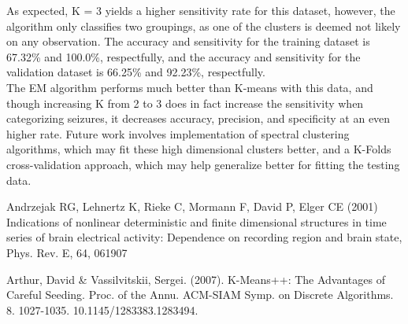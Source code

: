 \documentclass[tikz]{article}
\begin{document}
As expected, K = 3 yields a higher sensitivity rate for this dataset, however, the algorithm only classifies two groupings, as one of the clusters is deemed not likely on any observation. The accuracy and sensitivity for the training dataset is 67.32\% and 100.0\%, respectfully, and the accuracy and sensitivity for the validation dataset is 66.25\% and 92.23\%, respectfully. \\

The EM algorithm performs much better than K-means with this data, and though increasing K from 2 to 3 does in fact increase the sensitivity when categorizing seizures, it decreases accuracy, precision, and specificity at an even higher rate. Future work involves implementation of spectral clustering algorithms, which may fit these high dimensional clusters better, and a K-Folds cross-validation approach, which may help generalize better for fitting the testing data.

\begin{thebibliography}{666}
Andrzejak RG, Lehnertz K, Rieke C, Mormann F, David P, Elger CE (2001) Indications of nonlinear deterministic and finite dimensional structures in time series of brain electrical activity: Dependence on recording region and brain state, Phys. Rev. E, 64, 061907

Arthur, David \& Vassilvitskii, Sergei. (2007). K-Means++: The Advantages of Careful Seeding. Proc. of the Annu. ACM-SIAM Symp. on Discrete Algorithms. 8. 1027-1035. 10.1145/1283383.1283494. 
\end{thebibliography}
\end{document}

